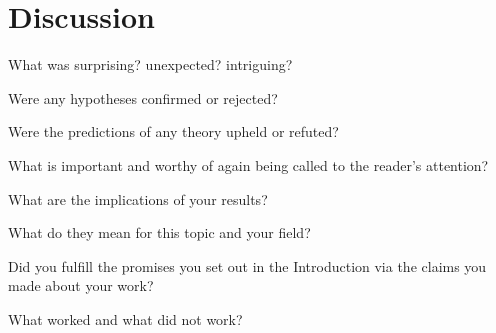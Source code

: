 \section{Discussion}
\label{sec:discussion}




What was surprising? unexpected? intriguing?

Were any hypotheses confirmed or rejected?

Were the predictions of any theory upheld or refuted?

What is important and worthy of again being called to the reader's attention?

What are the implications of your results?

What do they mean for this topic and your field?

Did you fulfill the promises you set out in the Introduction via the claims you made about your work?

What worked and what did not work?